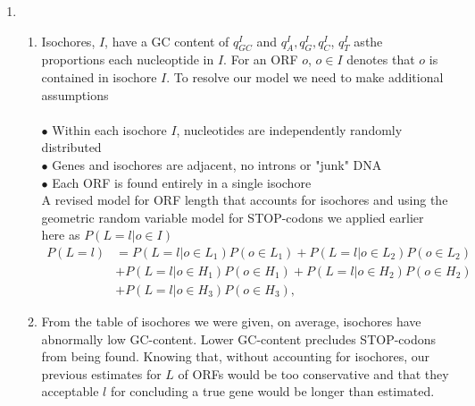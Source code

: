 \documentclass[12pt]{article}
\numberwithin{theorem}{subsection}
\theoremstyle{definition}
\numberwithin{definition}{subsection}
\numberwithin{corollary}{subsection}
\theoremstyle{remark}
\begin{document}
\begin{enumerate}[label=\textbf{\arabic*.}]
    \item 
        \begin{enumerate}[label = \textbf{\alph*.}]
            \item Isochores, $I$, have a GC content of $q_{GC}^I$ and $q_A^I, q_G^I, q_C^I$, $q_T^I$ asthe proportions each nucleoptide in $I$.  For an ORF $o$, $o \in I$ denotes that $o$ is contained in isochore $I$. To resolve our model we need to make additional assumptions\\\\
                    $\bullet$ Within each isochore $I$, nucleotides are independently randomly distributed \\
                    $\bullet$ Genes and isochores are adjacent, no introns or "junk" DNA \\
                    $\bullet$ Each ORF is found entirely in a single isochore \\
            A revised model for ORF length that accounts for isochores and using the geometric random variable model for STOP-codons we applied earlier here as $P(L = l | o \in I)$
                \begin{align*}
                    P(L = l) &= P(L = l | o \in L_1)P(o \in L_1) + P(L = l | o \in L_2)P(o \in L_2)\\
                             &+ P(L = l | o \in H_1)P(o \in H_1) + P(L = l | o \in H_2)P(o \in H_2)\\
                             &+ P(L = l | o \in H_3)P(o \in H_3),
                \end{align*}
            
            \item From the table of isochores we were given, on average, isochores have abnormally low GC-content. Lower GC-content precludes STOP-codons from being found. Knowing that, without accounting for isochores, our previous estimates for $L$ of ORFs would be too conservative and that they acceptable $l$ for concluding a true gene would be longer than estimated. 
        \end{enumerate}

    
  

\end{enumerate}

\printbibliography
\end{document}
